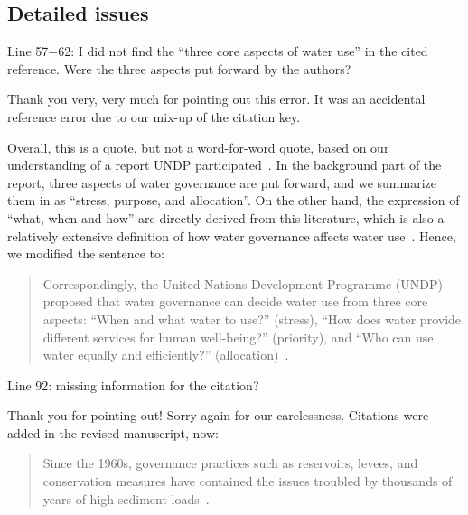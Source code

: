 \subsection{Detailed issues}

\RC{} Line 57$-$62: I did not find the ``three core aspects of water use'' in the cited reference. Were the three aspects put forward by the authors?

\AR Thank you very, very much for pointing out this error. It was an accidental reference error due to our mix-up of the citation key.

\AR*{} Overall, this is a quote, but not a word-for-word quote, based on our understanding of a report UNDP participated~\cite{mariajacobson2013}. In the background part of the report, three aspects of water governance are put forward, and we summarize them in as ``stress, purpose, and allocation''. On the other hand, the expression of ``what, when and how'' are directly derived from this literature, which is also a relatively extensive definition of how water governance affects water use~\cite{lasswell2018,allan2001,mariajacobson2013}. Hence, we modified the sentence to:

\begin{quote}
	Correspondingly, the United Nations Development Programme (UNDP) proposed that water governance can decide water use from three core aspects: ``When and what water to use?'' (stress), ``How does water provide different services for human well-being?'' (priority), and ``Who can use water equally and efficiently?'' (allocation)~\cite{mariajacobson2013}.
\end{quote}

\RC{} Line 92: missing information for the citation?

\AR{} Thank you for pointing out! Sorry again for our carelessness. Citations were added in the revised manuscript, now:

\begin{quote}
	Since the 1960s, governance practices such as reservoirs, levees, and conservation measures have contained the issues troubled by thousands of years of high sediment loads~\cite{wang2016a,song2020}.
\end{quote}

